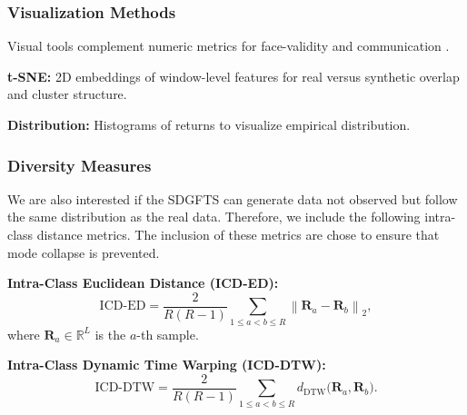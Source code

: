           \subsubsection{Visualization Methods} \label{sec:visualization_methods}
          Visual tools complement numeric metrics for face-validity and 
          communication \cite{Ang23}.
          \begin{enumerate}[label=\textbf{[M\arabic*]}, resume]
          \item \label{metric:tsne} \textbf{t-SNE:}  
          2D embeddings of window-level features for real 
          versus synthetic overlap and cluster structure.
          
          \item \label{metric:dist} \textbf{Distribution:}  
          Histograms of returns to visualize empirical 
          distribution.
          \end{enumerate}
          
          \subsubsection{Diversity Measures}
          We are also interested if the SDGFTS can generate data
          not observed but follow the same distribution as the real data.
          Therefore, we include the following intra-class distance
          metrics. The inclusion of
          these metrics are chose to ensure that mode collapse 
          is prevented. 

          
          \begin{enumerate}[label=\textbf{[M\arabic*]}, resume]
          \item \label{metric:ed} \textbf{Intra-Class Euclidean 
          Distance (ICD-ED):}  
          \[
          \mathrm{ICD\text{-}ED} = \frac{2}{R(R-1)} 
          \sum_{1 \le a < b \le R} \left\| \mathbf{R}_a - 
          \mathbf{R}_b \right\|_2,
          \]
          where \(\mathbf{R}_a \in \mathbb{R}^{L}\) is the \(a\)-th 
          sample.
          
          \item \label{metric:dtw} \textbf{Intra-Class Dynamic Time 
          Warping (ICD-DTW):}  
          \[
          \mathrm{ICD\text{-}DTW} = \frac{2}{R(R-1)} 
          \sum_{1 \le a < b \le R} d_{\mathrm{DTW}}\bigl(
          \mathbf{R}_a, \mathbf{R}_b\bigr).
          \]
          \end{enumerate}
          
